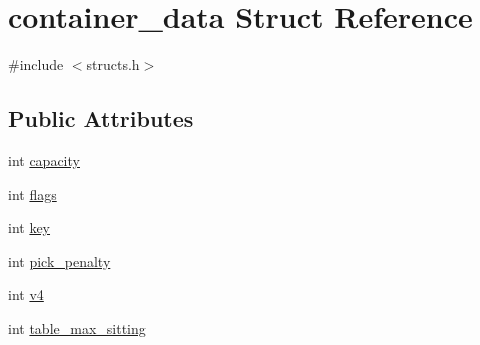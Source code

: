 \hypertarget{structcontainer__data}{\section{container\-\_\-data Struct Reference}
\label{structcontainer__data}
}


{\ttfamily \#include $<$structs.\-h$>$}

\subsection*{Public Attributes}
\begin{DoxyCompactItemize}
\item 
int \hyperlink{structcontainer__data_a7f9198aeb60e129115f0f00177d26e67}{capacity}
\item 
int \hyperlink{structcontainer__data_ab6059deaad4527f19157dc8331cd22a0}{flags}
\item 
int \hyperlink{structcontainer__data_a475cdb05b8ddd3b37f9d632e71307c8b}{key}
\item 
int \hyperlink{structcontainer__data_a48c09938bd258627bb48d7c8f0e4c970}{pick\-\_\-penalty}
\item 
int \hyperlink{structcontainer__data_a22bd3b03c4df68b04ba4801762f47cd9}{v4}
\item 
int \hyperlink{structcontainer__data_a342757f1dd74bddb200a8bfaa6e96d3a}{table\-\_\-max\-\_\-sitting}
\end{DoxyCompactItemize}


